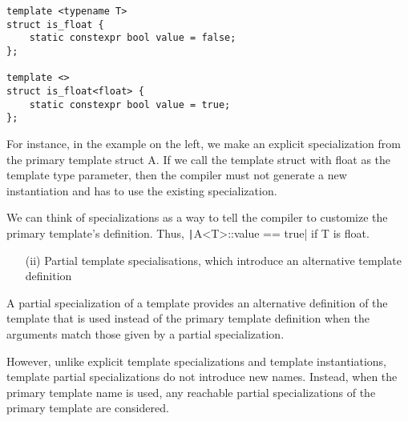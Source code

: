 \begin{paracol}{2}
\begin{verbatim}
template <typename T> 
struct is_float {  
    static constexpr bool value = false;  
}; 

template <> 
struct is_float<float> { 
    static constexpr bool value = true; 
}; 
\end{verbatim}

\switchcolumn

\vspace{5pt}

For instance, in the example on the left, we make an explicit specialization from the primary template struct A. If we call the template struct with float as the template type parameter, then the compiler must not generate a new instantiation and has to use the existing specialization. 

\vspace{10pt}

We can think of specializations as a way to tell the compiler to customize the primary template's definition. Thus, \texttt|A<T>::value == true| if T is float.

\end{paracol}

\begin{itemize}
    \item[(ii)] Partial template specialisations, which introduce an alternative template definition
\end{itemize}

A partial specialization of a template provides an alternative definition of the template that is used instead of the primary template definition when the arguments match those given by a partial specialization.

\vspace{10pt}

However, unlike explicit template specializations and template instantiations, template partial specializations do not introduce new names. Instead, when the primary template name is used, any reachable partial specializations of the primary template are considered.

